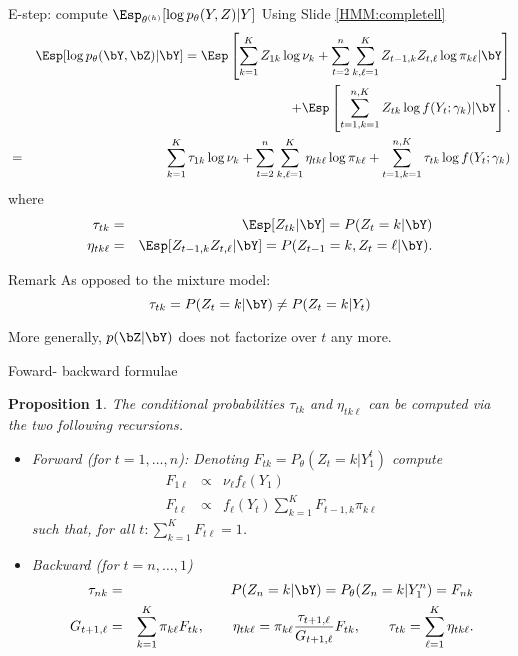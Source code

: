 \documentclass[compress,10pt]{beamer}
\newtheorem{proposition}{Proposition}
\begin{document}
\begin{frame}{E-step: compute $\Esp_{\theta^{(h)}}[\log p_\theta(Y, Z) | Y]$}
Using Slide \ref{HMM:completell}
\begin{eqnarray*}
&&\Esp[\log p_\theta(\bY, \bZ) | \bY]   =\Esp\left[ \sum_{k=1}^K Z_{1k} \log \nu_k + \sum_{t =2}^n \sum_{k, \ell=1 }^K {Z_{t-1, k} Z_{t, \ell}} \log \pi_{k\ell}|\bY \right]\\
&&  + \Esp\left[\sum_{t=1, k=1}^{n,K} {Z_{tk} \log f(Y_t; \gamma_k)}|\bY \right].\\
&=&   \sum_{k=1}^K \tau_{1k} \log \nu_k + \sum_{t=2}^n \sum_{k, \ell=1}^K \eta_{tk\ell} \log \pi_{k\ell} + \sum_{t=1, k=1}^{n,K} {\tau_{tk} \log f(Y_t; \gamma_k)}
\end{eqnarray*}
where
\begin{eqnarray*}
\tau_{tk}& =& \Esp[Z_{tk} | \bY] = P(Z_t = k|\bY)\\
\eta_{tk\ell} &=& \Esp[Z_{t-1, k} Z_{t, \ell} | \bY] = P(Z_{t-1} = k, Z_t = \ell | \bY).
\end{eqnarray*}
\end{frame}
 
\begin{frame}{Remark}
As opposed to the mixture model:  
$$\tau_{tk} = P(Z_t = k | \bY) \neq P(Z_t = k | Y_t)$$


More generally, $p(\bZ|\bY)$ does not factorize over $t$ any more.
\end{frame}


\begin{frame}{Foward- backward formulae}
\begin{proposition} \label{Prop:ForBack}
 The conditional probabilities $\tau_{tk}$ and $\eta_{tk\ell}$ can be computed via the two following recursions.
 \begin{itemize}
  \item \textcolor{dgreen}{Forward   (for $t=1, \dots, n$):} Denoting $F_{tk} = P_\theta(Z_t=k | Y_1^t)$ compute
  \begin{eqnarray*}
    F_{1\ell} & \propto & \nu_\ell f_\ell(Y_1)\\
    F_{t\ell}  &\propto&  f_\ell(Y_t) \sum_{k=1}^K F_{t-1, k} \pi_{k\ell} 
  \end{eqnarray*}
  such that, for all $t: \sum_{k =1}^KF_{t\ell} = 1$.
  \item\textcolor{dgreen}{Backward   (for $t=n, \dots, 1$)} 
\begin{eqnarray*}
\tau_{nk} &=& P(Z_n=k | \bY) = P_\theta(Z_n=k | Y_1^n) = F_{nk}\\
  G_{t+1, \ell} &=& \sum_{k=1}^K \pi_{k \ell} F_{tk}, \qquad
  \eta_{tk\ell} = \pi_{k \ell} \frac{\tau_{t+1, \ell}}{G_{t+1, \ell}}
  F_{tk}, \qquad \tau_{tk} = \sum_{\ell=1}^K \eta_{tk\ell}.
  \end{eqnarray*}
 \end{itemize}
\end{proposition}


\end{frame}
\end{document}
